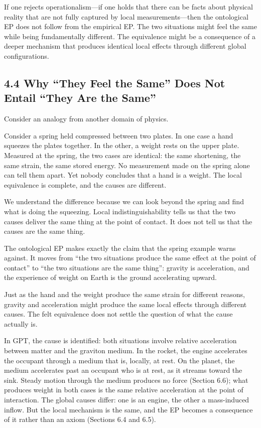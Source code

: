 \documentclass[11pt]{article}
\begin{document}
If one rejects operationalism---if one holds that there can be facts about physical reality that are not fully captured by local measurements---then the ontological EP does not follow from the empirical EP. The two situations might feel the same while being fundamentally different. The equivalence might be a consequence of a deeper mechanism that produces identical local effects through different global configurations.

\subsection{4.4 Why ``They Feel the Same'' Does Not Entail ``They Are the Same''}

Consider an analogy from another domain of physics.

Consider a spring held compressed between two plates. In one case a hand squeezes the plates together. In the other, a weight rests on the upper plate. Measured at the spring, the two cases are identical: the same shortening, the same strain, the same stored energy. No measurement made on the spring alone can tell them apart. Yet nobody concludes that a hand is a weight. The local equivalence is complete, and the causes are different.

We understand the difference because we can look beyond the spring and find what is doing the squeezing. Local indistinguishability tells us that the two causes deliver the same thing at the point of contact. It does not tell us that the causes are the same thing.

The ontological EP makes exactly the claim that the spring example warns against. It moves from ``the two situations produce the same effect at the point of contact'' to ``the two situations are the same thing'': gravity is acceleration, and the experience of weight on Earth is the ground accelerating upward.

Just as the hand and the weight produce the same strain for different reasons, gravity and acceleration might produce the same local effects through different causes. The felt equivalence does not settle the question of what the cause actually is.

In GPT, the cause is identified: both situations involve relative acceleration between matter and the graviton medium. In the rocket, the engine accelerates the occupant through a medium that is, locally, at rest. On the planet, the medium accelerates past an occupant who is at rest, as it streams toward the sink. Steady motion through the medium produces no force (Section 6.6); what produces weight in both cases is the same relative acceleration at the point of interaction. The global causes differ: one is an engine, the other a mass-induced inflow. But the local mechanism is the same, and the EP becomes a consequence of it rather than an axiom (Sections 6.4 and 6.5).
\end{document}
